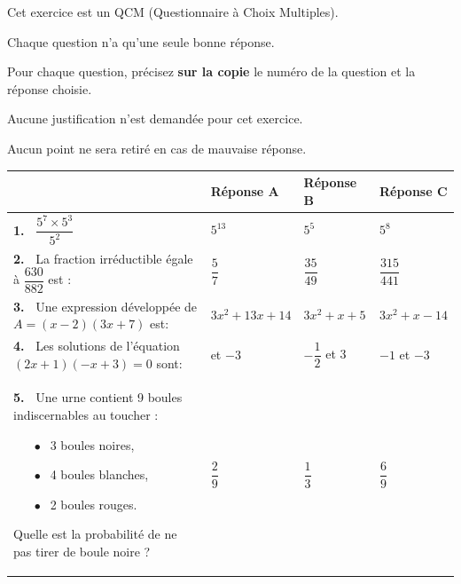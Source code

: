 \documentclass[exercice,a4]{thedocument}%
\begin{document}
%

\medskip

Cet exercice est un QCM (Questionnaire à Choix Multiples).

Chaque question n'a qu'une seule bonne réponse.

Pour chaque question, précisez \textbf{sur la copie} le numéro de la question et la réponse choisie.

Aucune justification n'est demandée pour cet exercice.

Aucun point ne sera retiré en cas de mauvaise réponse.

\begin{center}
\renewcommand\arraystretch{2}
\begin{tabularx}{\linewidth}{|m{5cm}|*{3}{>{\centering \arraybackslash}X|}}\cline{2-4}
\multicolumn{1}{c|}{~}&\textbf{Réponse A}&\textbf{Réponse B}&\textbf{Réponse C}\\ \hline
\textbf{1.~} $\dfrac{5^7 \times 5^3}{5^2}$&$5^{13}$&$5^5$&$5^8$\\ \hline
\textbf{2.~} La fraction irréductible égale à $\dfrac{630}{882}$ est :&$\dfrac57$&$\dfrac{35}{49}$&$\dfrac{315}{441}$\\ \hline
\textbf{3.~} Une expression développée de
$A = (x - 2)(3x + 7)$ est:&$3x^2 +13x +14$&$3x^2 +x +5$&$3x^2 +x -14$\\ \hline
\textbf{4.~}
Les solutions de l'équation $(2x + 1)(- x + 3) = 0$ sont:&2 et $- 3$&$- \dfrac12$ et 3&$- 1$ et $- 3$\\ \hline
\textbf{5.~}
Une urne contient 9 boules indiscernables au toucher :
\begin{itemize}
\item[$\bullet~~$]3 boules noires,
\item[$\bullet~~$]4 boules blanches,
\item[$\bullet~~$]2 boules rouges.
\end{itemize}

Quelle est la probabilité de ne pas tirer de boule noire ?&$\dfrac29$&$\dfrac13$&$\dfrac69$\\ \hline
\end{tabularx}
\renewcommand\arraystretch{1}
\end{center}

\bigskip

\showthesource
\end{document}
